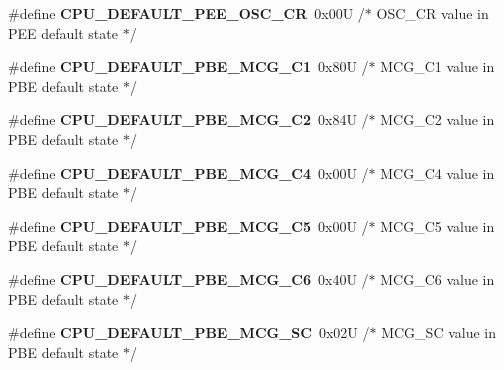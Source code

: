 \begin{DoxyCompactItemize}
\item 
\#define {\bfseries C\+P\+U\+\_\+\+D\+E\+F\+A\+U\+L\+T\+\_\+\+P\+E\+E\+\_\+\+O\+S\+C\+\_\+\+CR}~0x00\+U     /$\ast$ O\+S\+C\+\_\+\+C\+R value in P\+E\+E default state $\ast$/\hypertarget{group___c_p_u___config__module_gab4139225e48048e2820068c68224d1c7}{}\label{group___c_p_u___config__module_gab4139225e48048e2820068c68224d1c7}

\item 
\#define {\bfseries C\+P\+U\+\_\+\+D\+E\+F\+A\+U\+L\+T\+\_\+\+P\+B\+E\+\_\+\+M\+C\+G\+\_\+\+C1}~0x80\+U     /$\ast$ M\+C\+G\+\_\+\+C1 value in P\+B\+E default state $\ast$/\hypertarget{group___c_p_u___config__module_ga2663465bc3182a2c661e00823f24c04d}{}\label{group___c_p_u___config__module_ga2663465bc3182a2c661e00823f24c04d}

\item 
\#define {\bfseries C\+P\+U\+\_\+\+D\+E\+F\+A\+U\+L\+T\+\_\+\+P\+B\+E\+\_\+\+M\+C\+G\+\_\+\+C2}~0x84\+U     /$\ast$ M\+C\+G\+\_\+\+C2 value in P\+B\+E default state $\ast$/\hypertarget{group___c_p_u___config__module_ga5fb0054f5508f0f59f2bce420d6790e6}{}\label{group___c_p_u___config__module_ga5fb0054f5508f0f59f2bce420d6790e6}

\item 
\#define {\bfseries C\+P\+U\+\_\+\+D\+E\+F\+A\+U\+L\+T\+\_\+\+P\+B\+E\+\_\+\+M\+C\+G\+\_\+\+C4}~0x00\+U     /$\ast$ M\+C\+G\+\_\+\+C4 value in P\+B\+E default state $\ast$/\hypertarget{group___c_p_u___config__module_ga54e2abc5ed9886175b5712b224c4502a}{}\label{group___c_p_u___config__module_ga54e2abc5ed9886175b5712b224c4502a}

\item 
\#define {\bfseries C\+P\+U\+\_\+\+D\+E\+F\+A\+U\+L\+T\+\_\+\+P\+B\+E\+\_\+\+M\+C\+G\+\_\+\+C5}~0x00\+U     /$\ast$ M\+C\+G\+\_\+\+C5 value in P\+B\+E default state $\ast$/\hypertarget{group___c_p_u___config__module_ga5a3e4d769912d219767354e72b8075d1}{}\label{group___c_p_u___config__module_ga5a3e4d769912d219767354e72b8075d1}

\item 
\#define {\bfseries C\+P\+U\+\_\+\+D\+E\+F\+A\+U\+L\+T\+\_\+\+P\+B\+E\+\_\+\+M\+C\+G\+\_\+\+C6}~0x40\+U     /$\ast$ M\+C\+G\+\_\+\+C6 value in P\+B\+E default state $\ast$/\hypertarget{group___c_p_u___config__module_gae146c8a6847163cf6bda5771c627f4ae}{}\label{group___c_p_u___config__module_gae146c8a6847163cf6bda5771c627f4ae}

\item 
\#define {\bfseries C\+P\+U\+\_\+\+D\+E\+F\+A\+U\+L\+T\+\_\+\+P\+B\+E\+\_\+\+M\+C\+G\+\_\+\+SC}~0x02\+U     /$\ast$ M\+C\+G\+\_\+\+S\+C value in P\+B\+E default state $\ast$/\hypertarget{group___c_p_u___config__module_ga84346210f916f17218d2981a3e7bfa79}{}\label{group___c_p_u___config__module_ga84346210f916f17218d2981a3e7bfa79}


\end{DoxyCompactItemize}
